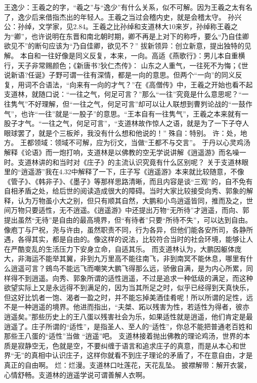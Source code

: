 \documentclass[]{book}
\begin{document}
王逸少：王羲之的字，``羲之''与``逸少''有什么关系，似不可解。因为王羲之太有名了，逸少后来借指杰出的年轻人。王羲之当过会稽内史，就是会稽太守。
孙兴公：孙绰，文学家，见2.84。王羲之比孙绰和支道林大10来岁，孙绰称王羲之为``卿''，也许说明在东晋和南北朝时期，卿不再是上对下的称呼，要么``乃自佳卿欲见不''的断句应该为``乃自佳卿，欲见不？''
拔新领异：创立新意，提出独特的见解。
本自和一往好像是同义反复，本来，一向。高适《燕歌行》：男儿本自重横行，天子非常赐颜色；《新唐书?狄仁杰传》：
山东之人重气，一往死不为悔；《世说新语?任诞》子野可谓一往有深情，都是一向的意思。但两个``一向''的同义反复，用词不合语法，``向来有一向的才气？''在《高僧传》中，王羲之开始也看不起支道林，就随口说：``一往之气，何足可言？''那么``一往''究竟是什么意思呢？``一往隽气''不好理解，但``一往之气，何足可言''却可以让人联想到曹刿论战的``一鼓作气''，也许``一往''就是``一股子''的意思。``王本自有一往隽气''，王羲之本来就有一股子才气。``一往之气，何足可言''，``支道林故作惊人之语，就是为了一下子夺人眼球罢了，就是个三板斧，我没有什么想和他说的！''
殊自：特别。 许：处，地方。
王都领域：领域不可解，应为衍文，当做``王都不与交言''。
于丹以心灵鸡汤解释《论语》而一炮打响，支道林是以佛教的空无学说讲解《逍遥游》而名噪一时。支道林讲的和当时对《庄子》的主流认识究竟有什么区别呢？
关于支道林眼里的``逍遥游''我在4.32中解释了一下，庄子写《逍遥游》本来就比较随意，不像《管子》、《韩非子》、《墨子》等那样思路清晰，而且内容是谈``三观''的，自不免有自相矛盾之处，给后世的阅读造成很大的障碍。当时大家比较接受向秀、郭象的解释，认为万物虽小大之别，但只有顺其自然，大鹏和小鸟逍遥皆同，推而及之，世间万物只要适性，无不逍遥。《逍遥游》中还提出万物``无所待''才逍遥，而向、郭提出虽然``无待''是自由的最高境界，但``有待者''只要``所待不失''，可以达到自由。像庖丁与尸祝，尧与许由，虽然职责不同，行为各异，但他们能各安所司，各静所遇，各得其实，都是自由的。像这样的说法，比较符合当时的社会环境，能够让人在严酷变乱的生活压力下安身立命，自适其乐。
而支道林认为，大鹏因躯体庞大，非海运不能举其翼，非到九万里高不能往南飞，非到南冥不能休息，哪里有什么逍遥可言？鴳鸟不能远飞而嘲笑大鹏飞得那么远，骄傲自满，是为内心所累，同样得不到逍遥。向秀、郭象所谓的适性逍遥，不过是追求一种低级的满足，而这种欲望实际上又是永远得不到满足的，因为当其所足之时，似乎已经得到天真快乐，但这好比饥者一饱、渴者一盈之时，并不能忘掉美酒佳肴呢！所以所谓的足性，远不是一种逍遥的境界。他进而指出，``夫桀、跖以残害为性，若适性为得者，彼亦逍遥矣。''那些历史上的王八蛋以残害社会为乐，如果适性就是逍遥，他们肯定是最逍遥了。庄子所谓的``适性''，是指圣人、至人的``适性''，你总不能把普通老百姓和那些王八蛋的``适性''当做
``逍遥''吧。
支道林接着抛出佛教的理论鸡汤，世界的本质是寂静空无，色就是空，不要纠缠于语言和追求庄子的真意，而是从本心和世界``无''的真相中认识庄子，这样你就看不到庄子理论的矛盾了，不在意自由，才是真正的自由啊。
烂：烂漫。支道林口吐莲花，天花乱坠。
披襟解带：解开衣裳，心情舒畅。支道林的逍遥学说可谓善解人衣啊。
\end{document}
